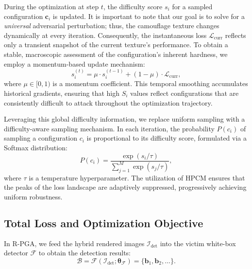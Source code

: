 \documentclass[10pt,journal,compsoc]{IEEEtran}
\begin{document}
During the optimization at step $t$, the difficulty score $s_i$ for a sampled configuration $\bm{c}_i$ is updated.
It is important to note that our goal is to solve for a \textit{universal} adversarial perturbation; thus, the camouflage texture changes dynamically at every iteration. 
Consequently, the instantaneous loss $\mathcal{L}_{\text{curr}}$ reflects only a transient snapshot of the current texture's performance.
To obtain a stable, macroscopic assessment of the configuration's inherent hardness, we employ a momentum-based update mechanism:
\begin{equation}
    s_i^{(t)} = \mu \cdot s_i^{(t-1)} + (1 - \mu) \cdot \mathcal{L}_{\text{curr}},
    \label{eq:momentum_update}
\end{equation}
where $\mu \in [0, 1)$ is a momentum coefficient.
This temporal smoothing accumulates historical gradients, ensuring that high $S_i$ values reflect configurations that are consistently difficult to attack throughout the optimization trajectory.

Leveraging this global difficulty information, we replace uniform sampling with a difficulty-aware sampling mechanism.
In each iteration, the probability $P(c_i)$ of sampling a configuration $c_i$ is proportional to its difficulty score, formulated via a Softmax distribution:
\begin{equation}
    P(c_i) = \frac{\exp(s_i / \tau)}{\sum_{j=1}^{M} \exp(s_j / \tau)},
    \label{eq:sampling_prob}
\end{equation}
where $\tau$ is a temperature hyperparameter.
The utilization of HPCM ensures that the peaks of the loss landscape are adaptively suppressed, progressively achieving uniform robustness.

\subsection{Total Loss and Optimization Objective}
\label{sec:4.4}
In R-PGA, we feed the hybrid rendered images $\mathcal{I}_{\text{det}}$ into the victim white-box detector $\mathcal{F}$ to obtain the detection results:
\begin{equation}
\mathcal{B} = \mathcal{F}(\mathcal{I}_{\text{det}}; \boldsymbol{\theta}_{\mathcal{F}}) = \{\boldsymbol{b}_1, \boldsymbol{b}_2, \dots \}. 
\end{equation}
\end{document}
